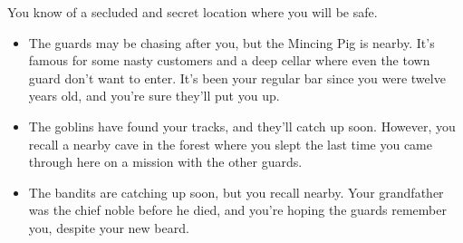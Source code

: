 \begin{multicols}{2}
You know of a secluded and secret location where you will be safe.

\begin{itemize}
  \item
  The guards may be chasing after you, but the Mincing Pig is nearby.  It's famous for some nasty customers and a deep cellar where even the town guard don't want to enter.
  It's been your regular bar since you were twelve years old, and you're sure they'll put you up.
  \item
  The goblins have found your tracks, and they'll catch up soon.
  However, you recall a nearby cave in the forest where you slept the last time you came through here on a mission with the other guards.
  \item
  The bandits are catching up soon, but you recall  nearby.
  Your grandfather was the chief noble before he died, and you're hoping the guards remember you, despite your new beard.
\end{itemize}

\end{multicols}

